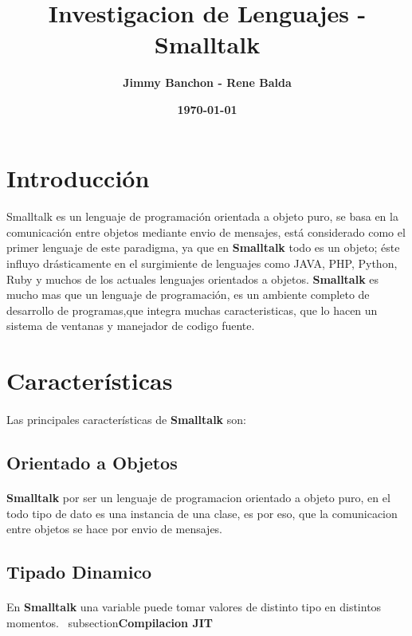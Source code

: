 \documentclass[11pt]{article}
\title{\textbf{Investigacion de Lenguajes - Smalltalk}}
\author{\textbf{Jimmy Banchon - Rene Balda}}
\date{\textbf{\today}}
\begin{document}
\maketitle
\section{\textbf{Introducción}} 
\paragraph{} \noindent
Smalltalk es un lenguaje de programación orientada a objeto puro, se basa en la comunicación entre objetos mediante envio de mensajes, está considerado como el primer lenguaje de este paradigma, ya que  en \textbf{Smalltalk} todo es un objeto; éste influyo drásticamente en el surgimiente de lenguajes como JAVA, PHP, Python, Ruby y muchos de los actuales lenguajes orientados a objetos.
 \textbf{Smalltalk} es mucho mas que un lenguaje de programación, es un ambiente completo de desarrollo de programas,que integra muchas caracteristicas, que lo hacen un sistema de ventanas y manejador de codigo fuente.
\section{\textbf{Características}}
\paragraph{} \noindent
Las principales características de  \textbf{Smalltalk} son:
\subsection{\textbf{Orientado a Objetos}}
\paragraph{} \noindent
\textbf{Smalltalk} por ser un lenguaje de programacion orientado a objeto puro, en el todo tipo de dato es una instancia de una clase, es por eso, que la comunicacion entre objetos se hace por envio de mensajes.
\subsection{\textbf{Tipado Dinamico}}
\paragraph{} \noindent
En \textbf{Smalltalk} una variable puede tomar valores de distinto tipo en distintos momentos.
\ subsection{\textbf{Compilacion JIT}}
\end{document}
